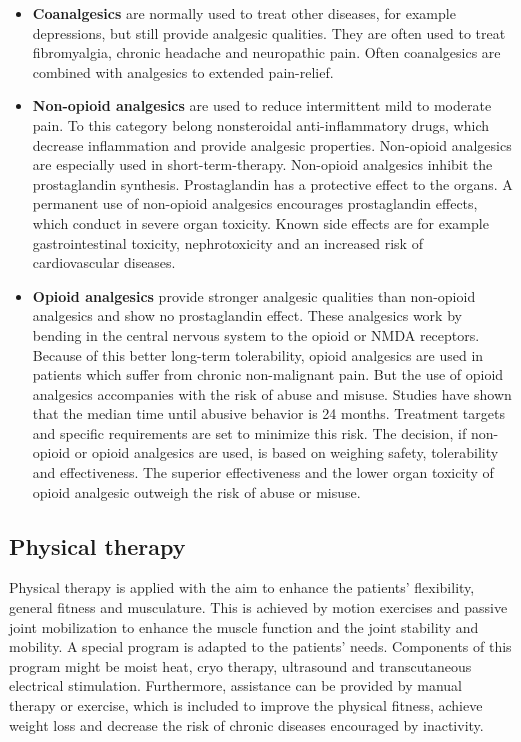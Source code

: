 \begin{itemize}
\item \textbf{Coanalgesics} are normally used to treat other diseases, for example depressions, but still provide analgesic qualities. They are often used to treat fibromyalgia, chronic headache and neuropathic pain. Often coanalgesics are combined with analgesics to extended pain-relief. \cite{marcus2009}

\item \textbf{Non-opioid analgesics} are used to reduce intermittent mild to moderate pain. To this category belong nonsteroidal anti-inflammatory drugs, which decrease inflammation and provide analgesic properties. Non-opioid analgesics are especially used in short-term-therapy. Non-opioid analgesics inhibit the prostaglandin synthesis. Prostaglandin has a protective effect to the organs. A permanent use of non-opioid analgesics encourages prostaglandin effects, which conduct in severe organ toxicity. Known side effects are for example gastrointestinal toxicity, nephrotoxicity and an increased risk of cardiovascular diseases. \cite{marcus2009,stein2007}

\item \textbf{Opioid analgesics} provide stronger analgesic qualities than non-opioid analgesics and show no prostaglandin effect. These analgesics work by bending in the central nervous system to the opioid or NMDA receptors.  Because of this better long-term tolerability, opioid analgesics are used in patients which suffer from chronic non-malignant pain. But the use of opioid analgesics accompanies with the risk of abuse and misuse. Studies have shown that the median time until abusive behavior is 24 months. Treatment targets and specific requirements are set to minimize this risk. \cite{marcus2009,stein2007}
The decision, if non-opioid or opioid analgesics are used, is based on weighing safety, tolerability and effectiveness. The superior effectiveness and the lower organ toxicity of opioid analgesic outweigh the risk of abuse or misuse. \cite{marcus2009} 
\end{itemize}

\subsection{Physical therapy}
Physical therapy is applied with the aim to enhance the patients' flexibility, general fitness and musculature. This is achieved by motion exercises and passive joint mobilization to enhance the muscle function and the joint stability and mobility. A special program is adapted to the patients' needs. Components of this program might be moist heat, cryo therapy, ultrasound and transcutaneous electrical stimulation. Furthermore, assistance can be provided by manual therapy or exercise, which is included to improve the physical fitness, achieve weight loss and decrease the risk of chronic diseases encouraged by inactivity. \cite{marcus2009,pope2017}

